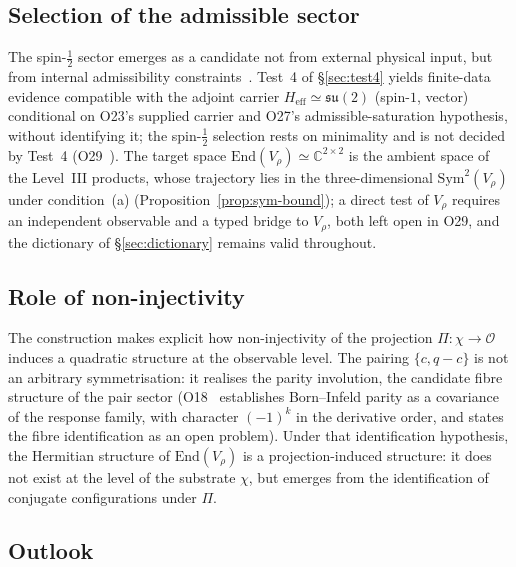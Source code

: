 \documentclass[12pt,a4paper]{article}
\theoremstyle{definition}
\theoremstyle{remark}
\begin{document}
  \subsection{Selection of the admissible sector}
    \label{sec:impl-sector}

    The spin-$\frac{1}{2}$ sector emerges as a candidate not from external physical
    input, but from internal admissibility constraints~\cite{Beau2026a1}.
    Test~4 of §\ref{sec:test4} yields finite-data evidence compatible with the adjoint carrier
    $H_{\mathrm{eff}} \simeq \mathfrak{su}(2)$ (spin-$1$, vector) conditional on O23's supplied carrier and O27's
    admissible-saturation hypothesis,
    without identifying it; the spin-$\tfrac{1}{2}$ selection rests on minimality and is not decided by
    Test~4 (O29~\cite{Beau2026a33}).
    The target space $\mathrm{End}(V_\rho) \simeq \mathbb{C}^{2 \times 2}$ is the ambient space of the Level~III
    products, whose trajectory lies in the three-dimensional $\mathrm{Sym}^2(V_\rho)$ under condition~(a)
    (Proposition~\ref{prop:sym-bound}); a direct test of $V_\rho$ requires an independent observable and a typed
    bridge to
    $V_\rho$, both left open in O29, and the dictionary of §\ref{sec:dictionary} remains valid throughout.

  \subsection{Role of non-injectivity}
    \label{sec:impl-noninj}

    The construction makes explicit how non-injectivity of the projection
    $\Pi : \chi \to \mathcal{O}$ induces a quadratic structure at the observable level.
    The pairing $\{c, q-c\}$ is not an arbitrary symmetrisation: it realises the
    parity involution, the candidate fibre structure of the pair sector
    (O18~\cite{Beau2026a22} establishes Born--Infeld parity as a covariance of the
    response family, with character $(-1)^{k}$ in the derivative order, and states the
    fibre identification as an open problem).
    Under that identification hypothesis, the Hermitian structure of
    $\mathrm{End}(V_\rho)$ is a projection-induced structure: it does not exist at
    the level of the substrate $\chi$, but emerges from the identification of
    conjugate configurations under $\Pi$.

  \subsection{Outlook}
    \label{sec:impl-outlook}
\end{document}
